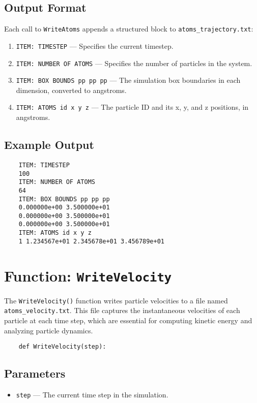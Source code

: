 \documentclass[12pt, ngerman]{report}
\begin{document}
\subsection*{Output Format}
Each call to \texttt{WriteAtoms} appends a structured block to \texttt{atoms\_trajectory.txt}:
\begin{enumerate}
	\item \texttt{ITEM: TIMESTEP} --- Specifies the current timestep.
	\item \texttt{ITEM: NUMBER OF ATOMS} --- Specifies the number of particles in the system.
	\item \texttt{ITEM: BOX BOUNDS pp pp pp} --- The simulation box boundaries in each dimension, converted to angstroms.
	\item \texttt{ITEM: ATOMS id x y z} --- The particle ID and its x, y, and z positions, in angstroms.
\end{enumerate}

\subsection*{Example Output}
\begin{verbatim}
	ITEM: TIMESTEP 
	100 
	ITEM: NUMBER OF ATOMS 
	64 
	ITEM: BOX BOUNDS pp pp pp 
	0.000000e+00 3.500000e+01 
	0.000000e+00 3.500000e+01 
	0.000000e+00 3.500000e+01 
	ITEM: ATOMS id x y z 
	1 1.234567e+01 2.345678e+01 3.456789e+01 
\end{verbatim}

\section{Function: \texttt{WriteVelocity}}
\label{sec:writevelocity}

The \texttt{WriteVelocity()} function writes particle velocities to a file named \texttt{atoms\_velocity.txt}. This file captures the instantaneous velocities of each particle at each time step, which are essential for computing kinetic energy and analyzing particle dynamics.

\begin{verbatim}
	def WriteVelocity(step):
\end{verbatim}

\subsection*{Parameters}
\begin{itemize}
	\item \texttt{step} --- The current time step in the simulation.
\end{itemize}
\end{document}
